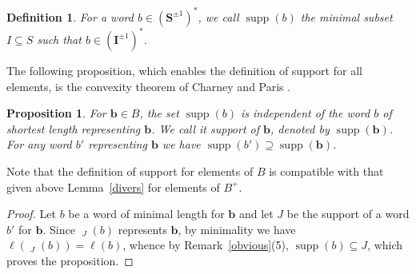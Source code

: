 \documentclass{amsart}
\numberwithin{equation}{section}
\newtheorem{proposition}[equation]{Proposition}
\newtheorem{definition}[equation]{Definition}
\newcommand\hl{{\ell}}
\newcommand\bb{{\mathbf b}}
\newcommand\bI{{\mathbf I}}
\newcommand\bS{{\mathbf S}}
\DeclareMathOperator\hpi{\hat\pi}
\DeclareMathOperator\supp{supp}
\begin{document}
\begin{definition} For a word $b\in(\bS^{\pm1})^*$, we call $\supp(b)$ the
minimal subset $I\subseteq S$ such that $b\in(\bI^{\pm1})^*$.
\end{definition}

The  following proposition, which enables the definition of support for all
elements, is the convexity theorem of Charney and Paris
\cite[Theorem~1.2]{Charney-Paris}.
\begin{proposition}\label{convexity} For $\bb\in B$, the set $\supp(b)$
is independent of the
word $b$ of shortest length representing $\bb$.
We call it support of $\bb$, denoted by $\supp(\bb)$. For any
word $b'$ representing $\bb$ we have $\supp(b')\supseteq\supp(\bb)$.
\end{proposition}
Note that the definition of support for elements of $B$ is compatible with
that given above Lemma~\ref{divers} for
elements of $B^+$.
\begin{proof}
Let $b$ be a word  of minimal
length  for $\bb$  and let $J$ be the support of a word $b'$ for $\bb$.
Since $\hpi_J(b)$ represents $\bb$, by minimality we have $\hl(\hpi_J(b))=\hl(b)$, 
whence by Remark~\ref{obvious}(5), $\supp(b)\subseteq J$,  which proves the
proposition.
\end{proof}
\end{document}
